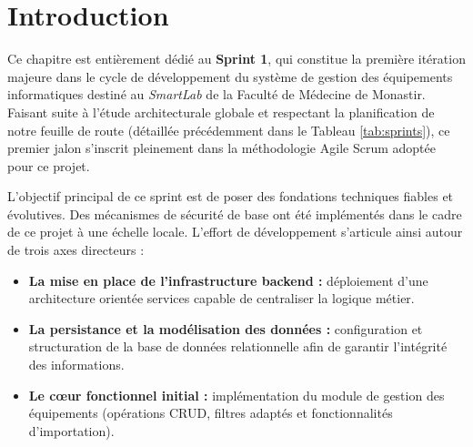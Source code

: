 \vspace{1cm}  
\label{chap:sprint1}
\setcounter{chapter}{5}
\setcounter{section}{0}


\localtableofcontents
\newpage

\section*{Introduction}
\label{sec:intro_sprint1}

Ce chapitre est entièrement dédié au \textbf{Sprint 1}, qui constitue la première itération majeure dans le cycle de développement du système de gestion des équipements informatiques destiné au \textit{SmartLab} de la Faculté de Médecine de Monastir. Faisant suite à l'étude architecturale globale et respectant la planification de notre feuille de route (détaillée précédemment dans le Tableau \ref{tab:sprints}), ce premier jalon s'inscrit pleinement dans la méthodologie Agile Scrum adoptée pour ce projet.

L’objectif principal de ce sprint est de poser des fondations techniques fiables et évolutives. Des mécanismes de sécurité de base ont été implémentés dans le cadre de ce projet à une échelle locale. L’effort de développement s’articule ainsi autour de trois axes directeurs :
\begin{itemize}
    \item \textbf{La mise en place de l’infrastructure backend :} déploiement d’une architecture orientée services capable de centraliser la logique métier.
    \item \textbf{La persistance et la modélisation des données :} configuration et structuration de la base de données relationnelle afin de garantir l’intégrité des informations.
    \item \textbf{Le cœur fonctionnel initial :} implémentation du module de gestion des équipements (opérations CRUD, filtres adaptés et fonctionnalités d’importation).
\end{itemize}

